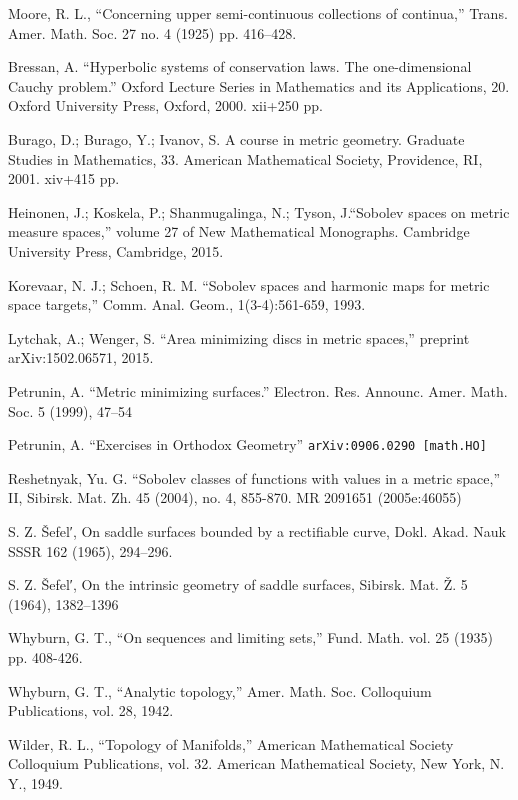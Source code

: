 \documentclass[a4paper,10pt]{amsart}
\begin{document}
\begin{thebibliography}{52}
Moore, R. L.,
``Concerning upper semi-continuous collections of continua,''
Trans. Amer. Math. Soc. 27 no. 4 (1925) pp. 416--428.

 Bressan, A.
``Hyperbolic systems of conservation laws.
The one-dimensional Cauchy problem.'' Oxford Lecture Series in Mathematics and its Applications, 20. Oxford University Press, Oxford, 2000. xii+250 pp.

Burago, D.; Burago, Y.; Ivanov, S.
A course in metric geometry.
Graduate Studies in Mathematics, 33. American Mathematical Society, Providence, RI, 2001. xiv+415 pp.

 Heinonen, J.;  Koskela, P.;  Shanmugalinga, N.; Tyson, J.``Sobolev spaces on metric measure spaces,''
volume 27 of New Mathematical Monographs. Cambridge University Press, Cambridge, 2015.

Korevaar, N. J.; Schoen, R. M. ``Sobolev spaces and harmonic maps for metric space targets,'' Comm. Anal. Geom., 1(3-4):561-659, 1993.

Lytchak, A.; Wenger, S. ``Area minimizing discs in metric spaces,'' preprint arXiv:1502.06571, 2015.

 Petrunin, A.
``Metric minimizing surfaces.''
Electron. Res. Announc. Amer. Math. Soc. 5 (1999), 47--54 

 Petrunin, A. 
``Exercises in Orthodox Geometry''
{\tt arXiv:0906.0290 [math.HO]}

Reshetnyak, Yu. G. ``Sobolev classes of functions with values in a metric space,'' II, Sibirsk. Mat. Zh. 45 (2004), no. 4, 855-870. MR 2091651 (2005e:46055)

 S. Z. \v{S}efel′, On saddle surfaces bounded by a rectifiable curve, Dokl. Akad. Nauk SSSR 162 (1965), 294--296.

 S. Z. \v{S}efel′, On the intrinsic geometry of saddle surfaces, Sibirsk. Mat. Ž. 5 (1964), 1382--1396

Whyburn, G. T., ``On sequences and limiting sets,'' Fund. Math. vol. 25 (1935) pp. 408-426.

Whyburn, G. T., ``Analytic topology,'' Amer. Math. Soc. Colloquium Publications, vol. 28, 1942.

Wilder, R. L., ``Topology of Manifolds,'' American Mathematical Society Colloquium Publications, vol. 32. American Mathematical
Society, New York, N. Y., 1949.
\end{thebibliography}
\end{document}

